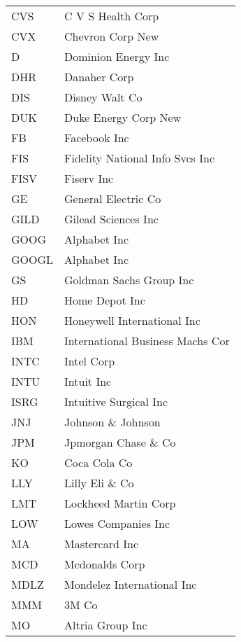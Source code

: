 \begin{tabular}{ll}
CVS    &                 C V S Health Corp \\
CVX    &                  Chevron Corp New \\
D      &               Dominion Energy Inc \\
DHR    &                      Danaher Corp \\
DIS    &                    Disney Walt Co \\
DUK    &              Duke Energy Corp New \\
FB     &                      Facebook Inc \\
FIS    &   Fidelity National Info Svcs Inc \\
FISV   &                        Fiserv Inc \\
GE     &               General Electric Co \\
GILD   &               Gilead Sciences Inc \\
GOOG   &                      Alphabet Inc \\
GOOGL  &                      Alphabet Inc \\
GS     &           Goldman Sachs Group Inc \\
HD     &                    Home Depot Inc \\
HON    &       Honeywell International Inc \\
IBM    &  International Business Machs Cor \\
INTC   &                        Intel Corp \\
INTU   &                        Intuit Inc \\
ISRG   &            Intuitive Surgical Inc \\
JNJ    &                Johnson \& Johnson \\
JPM    &              Jpmorgan Chase \& Co \\
KO     &                      Coca Cola Co \\
LLY    &                   Lilly Eli \& Co \\
LMT    &              Lockheed Martin Corp \\
LOW    &               Lowes Companies Inc \\
MA     &                    Mastercard Inc \\
MCD    &                    Mcdonalds Corp \\
MDLZ   &        Mondelez International Inc \\
MMM    &                             3M Co \\
MO     &                  Altria Group Inc \\

\end{tabular}
